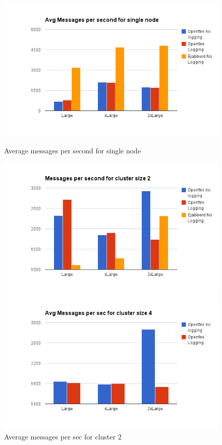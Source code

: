\documentclass[a4paper, twocolumn]{article}
\begin{document}
\begin{figure}[ht] \label{ fig7} 
  \begin{minipage}[b]{0.5\linewidth}
    \includegraphics[width=0.9\linewidth]{image__12_.png} 
    \caption{Average messages per second for single node} 
  \end{minipage} 
  \begin{minipage}[b]{0.5\linewidth}
    \includegraphics[width=0.9\linewidth]{image__13_.png} 
    \caption{Average messages per sec  for cluster 2} 
  \end{minipage} 
  \begin{minipage}[b]{0.5\linewidth}
    \includegraphics[width=0.9\linewidth]{image__14_.png} 

\end{minipage}
\end{figure}
\end{document}
